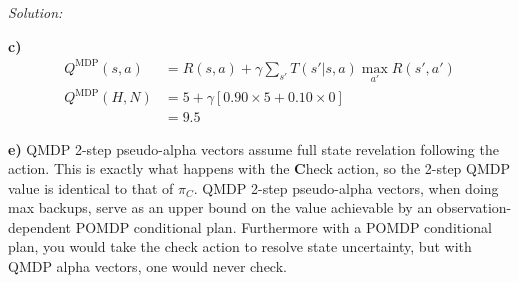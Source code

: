\documentclass{article}
\theoremstyle{definition}
\newenvironment{solution}{\noindent\textit{Solution:}}{}
\begin{document}
\begin{solution}
\begin{center}
\end{center}

\textbf{c)}
\begin{equation}
\begin{aligned}
    Q^{\text{MDP}}(s,a) & = R(s,a)+\gamma \sum_{s'}T(s'| s,a)\max_{a'}R(s',a') \\
    Q^{\text{MDP}}(H,N) &= 5 + \gamma \left[0.90 \times 5 + 0.10 \times 0\right] \\
    &= \boxed{9.5}
\end{aligned}
\end{equation}


\textbf{e)}
QMDP 2-step pseudo-alpha vectors assume full state revelation following the action. This is exactly what happens with the \textbf{C}heck action, so the 2-step QMDP value is identical to that of $\pi_C$. QMDP 2-step pseudo-alpha vectors, when doing max backups, serve as an upper bound on the value achievable by an observation-dependent POMDP conditional plan. Furthermore with a POMDP conditional plan, you would take the check action to resolve state uncertainty, but with QMDP alpha vectors, one would never check.



\end{solution}


\newpage
\end{document}
